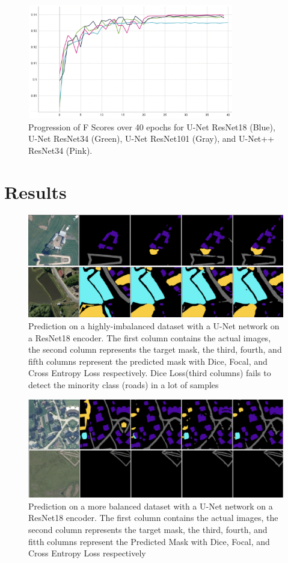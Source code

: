 \documentclass[conference]{IEEEtran}
\begin{document}
\begin{figure}[!h]
    \includegraphics[width=9cm, height=5cm]{images/encoders/encoders_fscore.png}
    \caption{Progression of F Scores over 40 epochs for U-Net ResNet18 (Blue), U-Net ResNet34 (Green), U-Net ResNet101 (Gray), and U-Net++ ResNet34 (Pink). }
\end{figure}


\section{Results}
\begin{figure}
    \includegraphics[]{images/no-roads-losses/no-roads-smaller.png}
    \caption{Prediction on a highly-imbalanced dataset with a U-Net network on a ResNet18 encoder. The first column contains the actual images, the second column represents the target mask, the third, fourth, and fifth columns represent the predicted mask with Dice, Focal, and Cross Entropy Loss respectively. Dice Loss(third columns) fails to detect the minority class (roads) in a lot of samples}
\end{figure}

\begin{figure}
    \includegraphics[]{images/roads-losses/roads-smaller.png}
    \caption{Prediction on a more balanced dataset with a U-Net network on a ResNet18 encoder. The first column contains the actual images, the second column represents the target mask, the third, fourth, and fitth columns represent the Predicted Mask with Dice, Focal, and Cross Entropy Loss respectively}
\end{figure}
\end{document}
